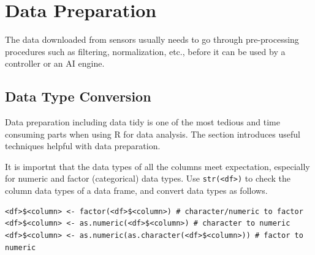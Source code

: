 \section{Data Preparation} \label{ch:r1:sec:datapreparation}

The data downloaded from sensors usually needs to go through pre-processing procedures such as filtering, normalization, etc., before it can be used by a controller or an AI engine.

\subsection{Data Type Conversion}

Data preparation including data tidy is one of the most tedious and time consuming parts when using R for data analysis. The section introduces useful techniques helpful with data preparation.

It is importnt that the data types of all the columns meet expectation, especially for numeric and factor (categorical) data types. Use \verb|str(<df>)| to check the column data types of a data frame, and convert data types as follows.
\begin{lstlisting}
<df>$<column> <- factor(<df>$<column>) # character/numeric to factor
<df>$<column> <- as.numeric(<df>$<column>) # character to numeric
<df>$<column> <- as.numeric(as.character(<df>$<column>)) # factor to numeric
\end{lstlisting}


